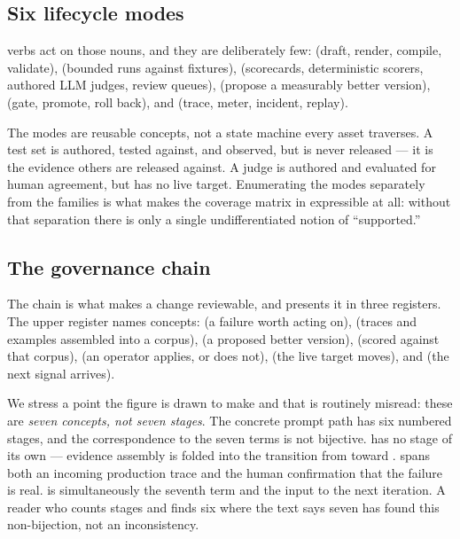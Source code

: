 \subsection{Six lifecycle modes}

\statModesC{} verbs act on those nouns, and they are deliberately few:
\mAuthor{} (draft, render, compile, validate), \mTest{} (bounded runs against
fixtures), \mEval{} (scorecards, deterministic scorers, authored LLM judges,
review queues), \mCal{} (propose a measurably better version), \mRel{} (gate,
promote, roll back), and \mObs{} (trace, meter, incident, replay).

The modes are reusable concepts, not a state machine every asset traverses. A test
set is authored, tested against, and observed, but is never released --- it is the
evidence others are released against. A judge is authored and evaluated for human
agreement, but has no live target. Enumerating the modes separately from the
families is what makes the coverage matrix in  expressible at
all: without that separation there is only a single undifferentiated notion of
``supported.''

\subsection{The governance chain}



The chain is what makes a change reviewable, and  presents it in
three registers. The upper register names \statChainTermsW{} concepts:
\cSignal{} (a failure worth acting on), \cEvidence{} (traces and examples
assembled into a corpus), \cCandidate{} (a proposed better version), \cMeasure{}
(scored against that corpus), \cDecision{} (an operator applies, or does not),
\cRelease{} (the live target moves), and \cTrace{} (the next signal arrives).

We stress a point the figure is drawn to make and that is routinely misread: these
are \emph{seven concepts, not seven stages}. The concrete prompt path has six
numbered stages, and the correspondence to the seven terms is not bijective.
\cEvidence{} has no stage of its own --- evidence assembly is folded into the
transition from  toward . \cSignal{} spans both an
incoming production trace and the human confirmation that the failure is real.
\cTrace{} is simultaneously the seventh term and the input to the next iteration.
A reader who counts stages and finds six where the text says seven has found this
non-bijection, not an inconsistency.

